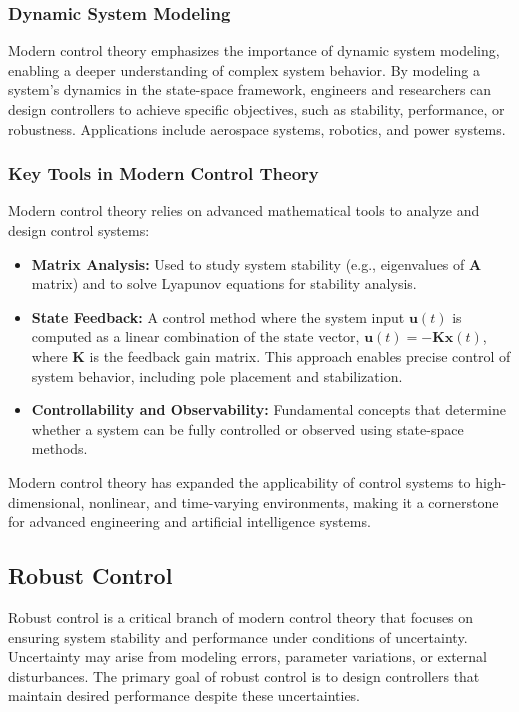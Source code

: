 \documentclass{IEEEojcsys}
\begin{document}
\subsubsection{Dynamic System Modeling}
Modern control theory emphasizes the importance of dynamic system modeling, enabling a deeper understanding of complex system behavior. By modeling a system's dynamics in the state-space framework, engineers and researchers can design controllers to achieve specific objectives, such as stability, performance, or robustness. Applications include aerospace systems, robotics, and power systems.

\subsubsection{Key Tools in Modern Control Theory}
Modern control theory relies on advanced mathematical tools to analyze and design control systems:
\begin{itemize}
    \item \textbf{Matrix Analysis:} Used to study system stability (e.g., eigenvalues of $\mathbf{A}$ matrix) and to solve Lyapunov equations for stability analysis.
    \item \textbf{State Feedback:} A control method where the system input $\mathbf{u}(t)$ is computed as a linear combination of the state vector, $\mathbf{u}(t) = -\mathbf{K}\mathbf{x}(t)$, where $\mathbf{K}$ is the feedback gain matrix. This approach enables precise control of system behavior, including pole placement and stabilization.
    \item \textbf{Controllability and Observability:} Fundamental concepts that determine whether a system can be fully controlled or observed using state-space methods.
\end{itemize}

Modern control theory has expanded the applicability of control systems to high-dimensional, nonlinear, and time-varying environments, making it a cornerstone for advanced engineering and artificial intelligence systems.

\subsection{Robust Control}
Robust control is a critical branch of modern control theory that focuses on ensuring system stability and performance under conditions of uncertainty. Uncertainty may arise from modeling errors, parameter variations, or external disturbances. The primary goal of robust control is to design controllers that maintain desired performance despite these uncertainties.
\end{document}
